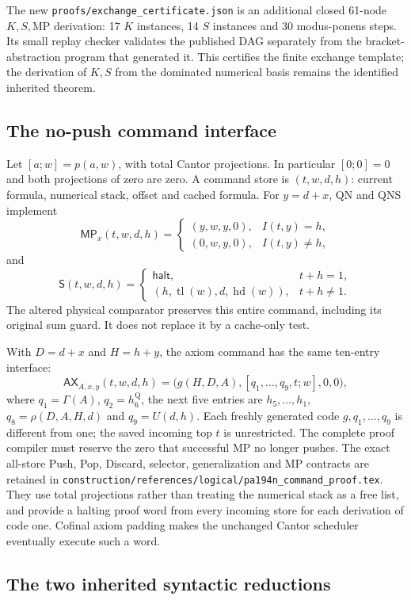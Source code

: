 \documentclass[11pt,letterpaper]{article}
\newcommand{\file}[1]{\nolinkurl{#1}}
\begin{document}
The new \file{proofs/exchange_certificate.json} is an additional closed
61-node $K,S,\mathrm{MP}$ derivation: 17 $K$ instances, 14 $S$ instances and
30 modus-ponens steps. Its small replay checker validates the published DAG
separately from the bracket-abstraction program that generated it. This
certifies the finite exchange template; the derivation of $K,S$ from the
dominated numerical basis remains the identified inherited theorem.

\subsection{The no-push command interface}

Let $[a;w]=p(a,w)$, with total Cantor projections. In particular
$[0;0]=0$ and both projections of zero are zero. A command store is
$(t,w,d,h)$: current formula, numerical stack, offset and cached formula.
For $y=d+x$, QN and QNS implement
\[
 \mathsf{MP}_x(t,w,d,h)=
 \begin{cases}(y,w,y,0),&I(t,y)=h,\\(0,w,y,0),&I(t,y)\ne h,\end{cases}
\]
and
\[
 \mathsf S(t,w,d,h)=
 \begin{cases}\mathsf{halt},&t+h=1,\\
 (h,\operatorname{tl}(w),d,\operatorname{hd}(w)),&t+h\ne1.
 \end{cases}
\]
The altered physical comparator preserves this entire command, including
its original sum guard. It does not replace it by a cache-only test.

With $D=d+x$ and $H=h+y$, the axiom command has the same ten-entry interface:
\[
 \mathsf{AX}_{A,x,y}(t,w,d,h)
  =\bigl(g(H,D,A),[q_1,\ldots,q_9,t;w],0,0\bigr),
\]
where $q_1=\Gamma(A)$, $q_2=h_6^{\mathrm Q}$, the next five entries are
$h_5,\ldots,h_1$, $q_8=\rho(D,A,H,d)$ and $q_9=U(d,h)$.
Each freshly generated code $g,q_1,\ldots,q_9$ is different from one;
the saved incoming top $t$ is unrestricted. The complete proof compiler
must reserve the zero that successful MP no longer pushes. The exact
all-store Push, Pop, Discard, selector, generalization and MP contracts are
retained in \file{construction/references/logical/pa194n_command_proof.tex}.
They use total projections rather than treating the numerical stack as a
free list, and provide a halting proof word from every incoming store for
each derivation of code one. Cofinal axiom padding makes the unchanged
Cantor scheduler eventually execute such a word.

\subsection{The two inherited syntactic reductions}
\end{document}
